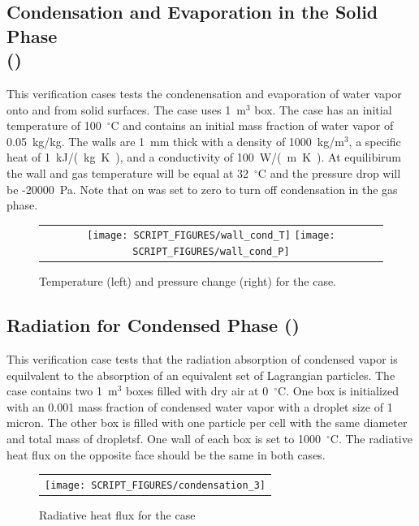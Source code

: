 \documentclass[11pt]{book}
\begin{document}
\subsection{Condensation and Evaporation in the Solid Phase\\(\texorpdfstring{}{wall\_cond})}
	\label{wall_condensation_evaporation}
This verification cases tests the condenensation and evaporation of water vapor onto and from solid surfaces. The case uses 1~m$^3$ box. The case has an initial temperature of 100~$^\circ$C and contains an initial mass fraction of water vapor of 0.05~kg/kg. The walls are 1~mm thick with a density of 1000~kg/m$^3$, a specific heat of 1~\si{kJ/(kg.K)}, and a conductivity of 100~\si{W/(m.K)}. At equilibirum the wall and gas temperature will be equal at 32~$^\circ$C and the pressure drop will be -20000~Pa. Note that  on  was set to zero to turn off condensation in the gas phase.

\begin{figure}[ht]
	\centering
	\begin{tabular}{c}
		\texttt{[image: SCRIPT\_FIGURES/wall\_cond\_T]}
		\texttt{[image: SCRIPT\_FIGURES/wall\_cond\_P]}
	\end{tabular}
	\caption[Results of the   case]{Temperature (left) and pressure change (right) for the  case.}
	\label{fig:wall_condensation}
\end{figure}


\subsection{Radiation for Condensed Phase (\texorpdfstring{} {condensation\_3})}
\label{condensation_radiation}
This verification case tests that the radiation absorption of condensed vapor is equilvalent to the absorption of an equivalent set of Lagrangian particles. The case contains two 1~m$^3$ boxes filled with dry air at 0~$^\circ$C. One box is initialized with an 0.001 mass fraction of condensed water vapor with a droplet size of 1 micron. The other box is filled with one particle per cell with the same diameter and total mass of dropletsf. One wall of each box is set to 1000~$^\circ$C. The radiative heat flux on the opposite face should be the same in both cases.

\begin{figure}[ht]
\centering
\begin{tabular}{c}
\texttt{[image: SCRIPT\_FIGURES/condensation\_3]}
\end{tabular}
\caption[Radiative heat flux for the  case]{Radiative heat flux for the  case}
\label{fig:condensation_3}
\end{figure}
\end{document}

